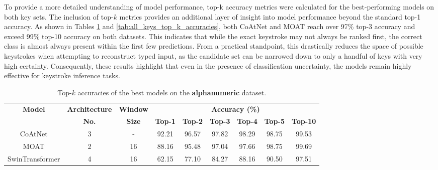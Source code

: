 \documentclass[a4paper,11pt,twoside]{report}
\theoremstyle{definition}
\begin{document}
To provide a more detailed understanding of model performance, top-k accuracy metrics were calculated for the best-performing models on both key sets. The inclusion of top-$k$ metrics provides an additional layer of insight into model performance beyond the standard top-1 accuracy. As shown in Tables \ref{tab:alphanumeric_top_k_accuracies} and \ref{tab:all_keys_top_k_accuracies}, both CoAtNet and MOAT reach over 97\% top-3 accuracy and exceed 99\% top-10 accuracy on both datasets. This indicates that while the exact keystroke may not always be ranked first, the correct class is almost always present within the first few predictions. From a practical standpoint, this drastically reduces the space of possible keystrokes when attempting to reconstruct typed input, as the candidate set can be narrowed down to only a handful of keys with very high certainty. Consequently, these results highlight that even in the presence of classification uncertainty, the models remain highly effective for keystroke inference tasks.


\begin{table}[h!]
\centering
\caption{Top-$k$ accuracies of the best models on the \textbf{alphanumeric} dataset.}
\begin{adjustbox}{max width=\textwidth}
\begin{tabular}{c|c|c|cccccc}
\hline
\textbf{Model} & \textbf{Architecture} & \textbf{Window} & \multicolumn{6}{c}{\textbf{Accuracy (\%)}} \\
\cline{4-9}
 & \textbf{No.} & \textbf{Size} & \textbf{Top-1} & \textbf{Top-2} & \textbf{Top-3} & \textbf{Top-4} & \textbf{Top-5} & \textbf{Top-10} \\
\hline
CoAtNet & 3 & - & 92.21 & 96.57 & 97.82 & 98.29 & 98.75 & 99.53 \\
MOAT & 2 & 16 & 88.16 & 95.48 & 97.04 & 97.66 & 98.75 & 99.69 \\
SwinTransformer & 4 & 16 & 62.15 & 77.10 & 84.27 & 88.16 & 90.50 & 97.51 \\
\hline
\end{tabular}
\end{adjustbox}
\label{tab:alphanumeric_top_k_accuracies}
\end{table}
\end{document}
